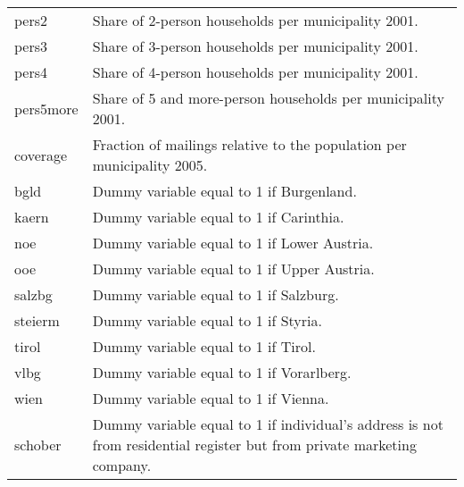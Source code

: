 \begin{longtable}[t]{l>{\raggedright\arraybackslash}p{30em}}
pers2 & Share of 2-person households per municipality 2001.\\
pers3 & Share of 3-person households per municipality 2001.\\
\addlinespace
pers4 & Share of 4-person households per municipality 2001.\\
pers5more & Share of 5 and more-person households per municipality 2001.\\
coverage & Fraction of mailings relative to the population per municipality 2005.\\
bgld & Dummy variable equal to 1 if Burgenland.\\
kaern & Dummy variable equal to 1 if Carinthia.\\
\addlinespace
noe & Dummy variable equal to 1 if Lower Austria.\\
ooe & Dummy variable equal to 1 if Upper Austria.\\
salzbg & Dummy variable equal to 1 if Salzburg.\\
steierm & Dummy variable equal to 1 if Styria.\\
tirol & Dummy variable equal to 1 if Tirol.\\
\addlinespace
vlbg & Dummy variable equal to 1 if Vorarlberg.\\
wien & Dummy variable equal to 1 if Vienna.\\
schober & Dummy variable equal to 1 if individual’s address is not from residential register but from private marketing company.\\*
\end{longtable}
